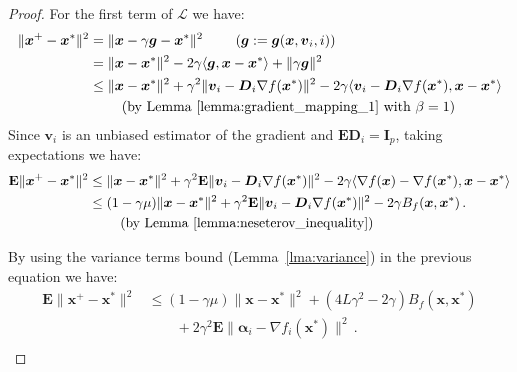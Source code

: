 \documentclass{article}
\newcommand{\Econd}{\mathbf{E}}
\def\xx{{\boldsymbol x}}
\def\vv{{\boldsymbol v}}
\def\DD{{\boldsymbol D}}
\begin{document}
\begin{proof}
  For the first term of $\mathcal{L}$ we have:
  \begin{align}
    \|\xx^+ - \xx^*\|^2 &= \|\xx - \gamma \boldsymbol g - \xx^*\|^2 \qquad \text{ ($\boldsymbol g := \boldsymbol g(\xx, \vv_i, i)$)}   \nonumber\\
    &= \|\xx - \xx^*\|^2 - 2\gamma \langle \boldsymbol g, \xx - \xx^* \rangle + \|\gamma \boldsymbol g\|^2 \nonumber\\
    &\leq \|\xx - \xx^*\|^2 +  \gamma^2\| \vv_i -  \DD_i \nabla f(\xx^*) \|^2 - 2 \gamma\langle  \vv_i - \DD_i \nabla f(\xx^*) , \xx - \xx^*\rangle \nonumber\\
    &\qquad \text{ (by Lemma~\ref{lemma:gradient_mapping_1} with $\beta=1$)}\nonumber\\
  \end{align}
Since $\vv_i$ is an unbiased estimator of the gradient and  $\Econd \DD_i =  \boldsymbol I_p$, taking expectations we have:
\begin{equation}\label{eq:proof_lyapunov_1}
  \begin{aligned}
    \Econd \|\xx^+ - \xx^*\|^2 &\leq \|\xx - \xx^*\|^2 +  \gamma^2\Econd\| \vv_i -  \DD_i \nabla f(\xx^*) \|^2 - 2 \gamma\langle  \nabla f(\xx) - \nabla f(\xx^*) , \xx - \xx^*\rangle\\
    &\leq (1 - \gamma \mu)\|\xx - \xx^*\|^2 +  \gamma^2\Econd\| \vv_i -  \DD_i \nabla f(\xx^*) \|^2 - 2 \gamma B_f(\xx, \xx^*)\,.\\
    &\qquad \text{ (by Lemma~\ref{lemma:neseterov_inequality})}
  \end{aligned}
\end{equation}

By using the variance terms bound (Lemma~\ref{lma:variance}) in the previous equation we have:
\begin{equation}\label{eq:lemma_lyapunov_3}
  \begin{aligned}
    \Econd \|\xx^+ - \xx^*\|^2
    &\leq (1 - \gamma \mu)\|\xx - \xx^*\|^2 + (4 L \gamma^2 - 2 \gamma) B_f(\xx, \xx^*)\\
    &\qquad + 2 \gamma^2 \Econd \|{\boldsymbol\alpha}_i - \nabla f_i(\xx^*)\|^2\,.\\
  \end{aligned}
\end{equation}


\end{proof}
\end{document}
